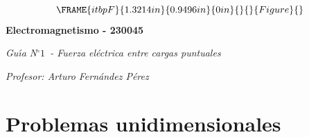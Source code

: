 \documentclass[12pt]{article}
\begin{document}
\begin{center}
\begin{equation*}
\FRAME{itbpF}{1.3214in}{0.9496in}{0in}{}{}{Figure}{\special{language
"Scientific Word";type "GRAPHIC";maintain-aspect-ratio TRUE;display
"USEDEF";valid_file "T";width 1.3214in;height 0.9496in;depth
0in;original-width 1.3552in;original-height 0.9669in;cropleft "0";croptop
"1";cropright "1";cropbottom "0";tempfilename
'QYQ9VJ00.bmp';tempfile-properties "XPR";}}
\end{equation*}%
\textbf{Electromagnetismo - 230045}

\emph{Gu\'{\i}a N}$%
{{}^\circ}%
1$\emph{\ - Fuerza el\'{e}ctrica entre cargas puntuales}

\textit{Profesor: Arturo Fern\'{a}ndez P\'{e}rez}
\end{center}

\section{Problemas unidimensionales}
\end{document}
